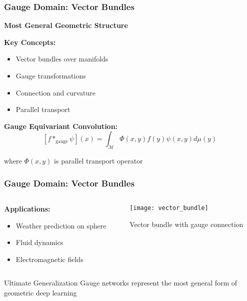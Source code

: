 \begin{frame}[fragile]\frametitle{Gauge Domain: Vector Bundles}

\begin{center}
\textbf{Most General Geometric Structure}
\end{center}


\textbf{Key Concepts:}
\begin{itemize}
\item Vector bundles over manifolds
\item Gauge transformations
\item Connection and curvature
\item Parallel transport
\end{itemize}

\textbf{Gauge Equivariant Convolution:}
$$[f *_{\text{gauge}} \psi](x) = \int_{\mathcal{M}} \Phi(x,y) f(y) \psi(x,y) d\mu(y)$$

where $\Phi(x,y)$ is parallel transport operator

\end{frame}


\begin{frame}[fragile]\frametitle{Gauge Domain: Vector Bundles}

\begin{columns}
\begin{column}{0.6\textwidth}
\textbf{Applications:}
\begin{itemize}
\item Weather prediction on sphere
\item Fluid dynamics
\item Electromagnetic fields
\end{itemize}
\end{column}
\begin{column}{0.4\textwidth}
\begin{center}
\texttt{[image: vector\_bundle]}

{\small Vector bundle with gauge connection}
\end{center}
\end{column}
\end{columns}

\begin{alertblock}{Ultimate Generalization}
Gauge networks represent the most general form of geometric deep learning
\end{alertblock}

\end{frame}

